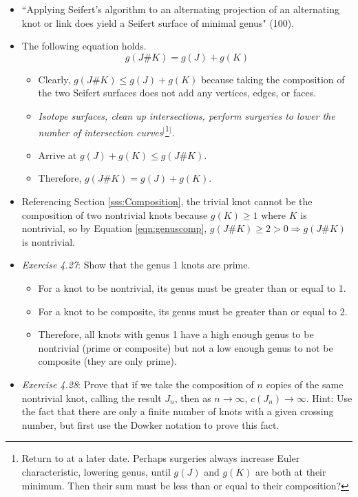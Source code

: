 \documentclass[titlepage]{article}
\numberwithin{figure}{section}
\numberwithin{table}{section}
\numberwithin{equation}{section}
\newcommand{\dq}[2]{``#1" (#2).}
\begin{document}
\begin{itemize}
\begin{itemize}
    \end{itemize}
    \item \dq{Applying Seifert's algorithm to an alternating projection of an alternating knot or link does yield a Seifert surface of minimal genus}{100}
    \item The following equation holds.
    \begin{equation}\label{eqn:genuscomp}
        g(J\#K)=g(J)+g(K)
    \end{equation}
    \begin{itemize}
        \item Clearly, $g(J\#K)\leq g(J)+g(K)$ because taking the composition of the two Seifert surfaces does not add any vertices, edges, or faces.
        \item \emph{Isotope surfaces, clean up intersections, perform surgeries to lower the number of intersection curves}$^[$\footnote{Return to at a later date. Perhaps surgeries always increase Euler characteristic, lowering genus, until $g(J)$ and $g(K)$ are both at their minimum. Then their sum must be less than or equal to their composition?}$^]$.
        \item Arrive at $g(J)+g(K)\leq g(J\#K)$.
        \item Therefore, $g(J\#K)=g(J)+g(K)$.
    \end{itemize}
    \item Referencing Section \ref{sss:Composition}, the trivial knot cannot be the composition of two nontrivial knots because $g(K)\geq 1$ where $K$ is nontrivial, so by Equation \ref{eqn:genuscomp}, $g(J\#K)\geq 2>0\Rightarrow g(J\#K)$ is nontrivial.
    \item \emph{Exercise 4.27}: Show that the genus 1 knots are prime.
    \begin{itemize}
        \item For a knot to be nontrivial, its genus must be greater than or equal to 1.
        \item For a knot to be composite, its genus must be greater than or equal to 2.
        \item Therefore, all knots with genus 1 have a high enough genus to be nontrivial (prime or composite) but not a low enough genus to not be composite (they are only prime).
    \end{itemize}
    \item \emph{Exercise 4.28}: Prove that if we take the composition of $n$ copies of the same nontrivial knot, calling the result $J_n$, then as $n\rightarrow\infty$, $c(J_n)\rightarrow\infty$. Hint: Use the fact that there are only a finite number of knots with a given crossing number, but first use the Dowker notation to prove this fact.

\end{itemize}
\end{document}
